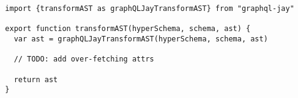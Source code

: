 \begin{verbatim}
  import {transformAST as graphQLJayTransformAST} from "graphql-jay"

  export function transformAST(hyperSchema, schema, ast) {
    var ast = graphQLJayTransformAST(hyperSchema, schema, ast)

    // TODO: add over-fetching attrs

    return ast
  }
\end{verbatim}
